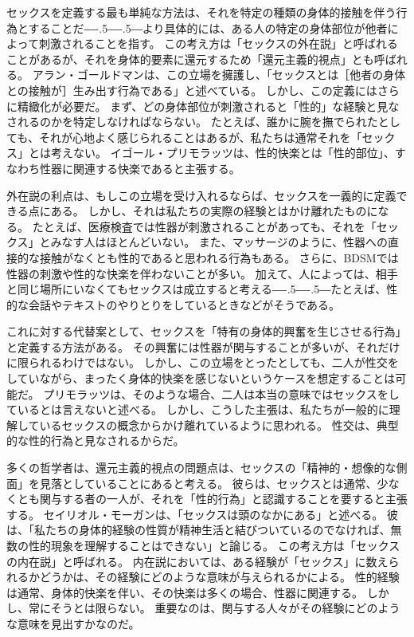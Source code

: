 \documentclass[paper=a4,book,openany]{jlreq}
\newcommand{\ig}[1]{}           %
\def\DDASH{―\kern-.5\zw―\kern-.5\zw―}
\begin{document}
セックスを定義する最も単純な方法は、それを特定の種類の身体的接触を伴う行為とすることだ{\DDASH}より具体的には、ある人の特定の身体部位が他者によって刺激されることを指す。
この考え方は「セックスの外在説」と呼ばれることがあるが、それを身体的要素に還元するため「還元主義的視点」とも呼ばれる。
アラン・ゴールドマンは、この立場を擁護し、「セックスとは［他者の身体との接触が］生み出す行為である」と述べている\citep[p.268]{goldman77:_plain_sex}。\ig{Alan Goldman}
しかし、この定義にはさらに精緻化が必要だ。
まず、どの身体部位が刺激されると「性的」な経験と見なされるのかを特定しなければならない。
たとえば、誰かに腕を撫でられたとしても、それが心地よく感じられることはあるが、私たちは通常それを「セックス」とは考えない。
イゴール・プリモラッツは、性的快楽とは「性的部位」、すなわち性器に関連する快楽であると主張する\citep[p.46]{primoratz99:_ethic_and_sex}。

外在説の利点は、もしこの立場を受け入れるならば、セックスを一義的に定義できる点にある。
しかし、それは私たちの実際の経験とはかけ離れたものになる。
たとえば、医療検査では性器が刺激されることがあっても、それを「セックス」とみなす人はほとんどいない。
また、マッサージのように、性器への直接的な接触がなくとも性的であると思われる行為もある。
さらに、BDSMでは性器の刺激や性的な快楽を伴わないことが多い。
加えて、人によっては、相手と同じ場所にいなくてもセックスは成立すると考える{\DDASH}たとえば、性的な会話やテキストのやりとりをしているときなどがそうである\citep[pp. 19--20]{soble06:_activ_sexual}。

これに対する代替案として、セックスを「特有の身体的興奮を生じさせる行為」と定義する方法がある。
その興奮には性器が関与することが多いが、それだけに限られるわけではない\citep{janssen02:_sexual_inhib_sis1,janssen02:_sexual_inhib_sis2}。
しかし、この立場をとったとしても、二人が性交をしていながら、まったく身体的快楽を感じないというケースを想定することは可能だ。
プリモラッツは、そのような場合、二人は本当の意味ではセックスをしているとは言えないと述べる\citep[pp. 47--49]{primoratz99:_ethic_and_sex}。
しかし、こうした主張は、私たちが一般的に理解しているセックスの概念からかけ離れているように思われる。
性交は、典型的な性的行為と見なされるからだ。

多くの哲学者は、還元主義的視点の問題点は、セックスの「精神的・想像的な側面」を見落としていることにあると考える。
彼らは、セックスとは通常、少なくとも関与する者の一人が、それを「性的行為」と認識することを要すると主張する。
セイリオル・モーガン\ig{セイリオル・モーガン}は、「セックスは頭のなかにある」と述べる。
彼は、「私たちの身体的経験の性質が精神生活と結びついているのでなければ、無数の性的現象を理解することはできない」と論じる\citep[p.5]{morgan03:_sex_in_head}。
この考え方は「セックスの内在説」と呼ばれる。
内在説においては、ある経験が「セックス」に数えられるかどうかは、その経験にどのような意味が与えられるかによる。
性的経験は通常、身体的快楽を伴い、その快楽は多くの場合、性器に関連する。
しかし、常にそうとは限らない。
重要なのは、関与する人々がその経験にどのような意味を見出すかなのだ。
\end{document}
